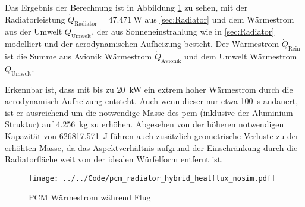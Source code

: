 Das Ergebnis der Berechnung ist in Abbildung \ref{fig:pcm_waermestrom_vorauslegung} zu sehen, mit der Radiatorleistung $\dot{Q}_\mathrm{Radiator} = \SI{47.471}{\watt}$
aus \ref{sec:Radiator} und dem Wärmestrom aus der Umwelt $\dot{Q}_\mathrm{Umwelt}$, der aus Sonneneinstrahlung wie in \ref{sec:Radiator} modelliert
und der aerodynamischen Aufheizung besteht.
Der Wärmestrom $\dot{Q}_\mathrm{Rein}$ ist die Summe aus Avionik Wärmestrom $\dot{Q}_\mathrm{Avionik}$ und dem Umwelt Wärmestrom $\dot{Q}_\mathrm{Umwelt}$.

Erkennbar ist, dass mit bis zu \SI{20}{\kilo\watt} ein extrem hoher Wärmestrom durch die aerodynamisch Aufheizung entsteht.
Auch wenn dieser nur etwa \SI{100}{\second} andauert, ist er ausreichend um die notwendige Masse des \ac{pcm} (inklusive der Aluminium Struktur)
auf \SI{4,256}{\kilo\gram} zu erhöhen. Abgesehen von der höheren notwendigen Kapazität von \SI{626817.571}{\joule} führen auch zusätzlich geometrische
Verluste zu der erhöhten Masse, da das Aspektverhältnis aufgrund der Einschränkung durch die Radiatorfläche weit von der idealen Würfelform entfernt ist.

\begin{figure}
  \centering
  \texttt{[image: ../../Code/pcm\_radiator\_hybrid\_heatflux\_nosim.pdf]}
  \caption{PCM Wärmestrom während Flug}\label{fig:pcm_waermestrom_vorauslegung}
\end{figure}